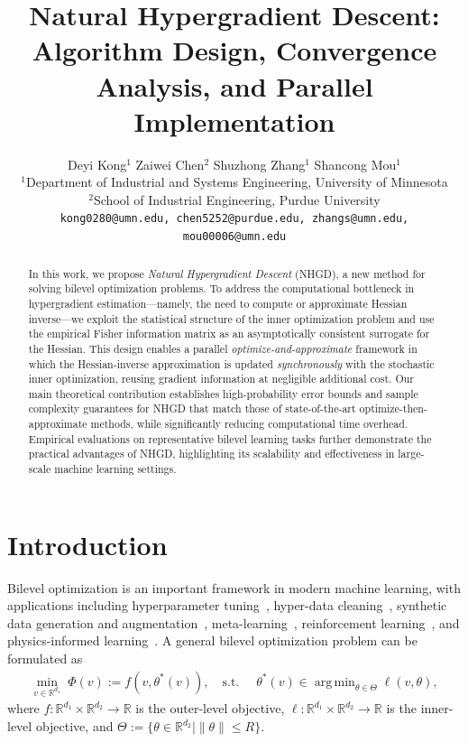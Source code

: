 \documentclass[11 pt]{article}
\title{\bfseries Natural Hypergradient Descent: Algorithm Design, Convergence Analysis, and Parallel Implementation}
\author{
Deyi Kong$^{1}$ \quad
Zaiwei Chen$^{2}$ \quad
Shuzhong Zhang$^{1}$ \quad
Shancong Mou$^{1}$\\[0.3em]
{\small $^{1}$Department of Industrial and Systems Engineering, University of Minnesota}\\
{\small $^{2}$School of Industrial Engineering, Purdue University}\\[0.3em]
{\small \texttt{kong0280@umn.edu, chen5252@purdue.edu, zhangs@umn.edu, mou00006@umn.edu}}
}
\date{}
\DeclareMathOperator*{\argmin}{arg\,min}
\begin{document}
\maketitle
\begin{abstract}
In this work, we propose \emph{Natural Hypergradient Descent} (NHGD), a new method for solving bilevel optimization problems. To address the computational bottleneck in hypergradient estimation—namely, the need to compute or approximate Hessian inverse—we exploit the statistical structure of the inner optimization problem and use the empirical Fisher information matrix as an asymptotically consistent surrogate for the Hessian. This design enables a parallel \emph{optimize-and-approximate} framework in which the Hessian-inverse approximation is updated \emph{synchronously} with the stochastic inner optimization, reusing gradient information at negligible additional cost. Our main theoretical contribution establishes high-probability error bounds and sample complexity guarantees for NHGD that match those of state-of-the-art optimize-then-approximate methods, while significantly reducing computational time overhead. Empirical evaluations on representative bilevel learning tasks further demonstrate the practical advantages of NHGD, highlighting its scalability and effectiveness in large-scale machine learning settings.
\end{abstract}

\section{Introduction}
Bilevel optimization is an important framework in modern machine learning, with applications including hyperparameter tuning~\cite{bae2020delta,franceschi2018bilevel}, hyper-data cleaning~\cite{franceschi2017forward}, 
synthetic data generation and augmentation~\cite{mounsaveng2021learning,mou2025synth4seg},
meta-learning~\cite{mishchenko2023convergence}, reinforcement learning~\cite{prakash2025bi}, and physics-informed learning~\cite{hao2023bi}. A general bilevel optimization problem can be formulated as
\begin{align*}
    \min_{v\in\mathbb{R}^{d_1}} \; \Phi(v):=f(v,\theta^*(v)),  
   \quad\text{s.t.}\;\; &\theta^*(v) \in \argmin_{\theta\in\Theta} \ell(v,\theta),
\end{align*}
where $f:\mathbb{R}^{d_1}\times\mathbb{R}^{d_2}\to\mathbb{R}$ is the outer-level objective, 
$\ell:\mathbb{R}^{d_1}\times\mathbb{R}^{d_2}\to\mathbb{R}$ is the inner-level objective, and 
$\Theta := \{\theta \in \mathbb{R}^{d_2} \mid \|\theta\| \le R\}$.
\end{document}

